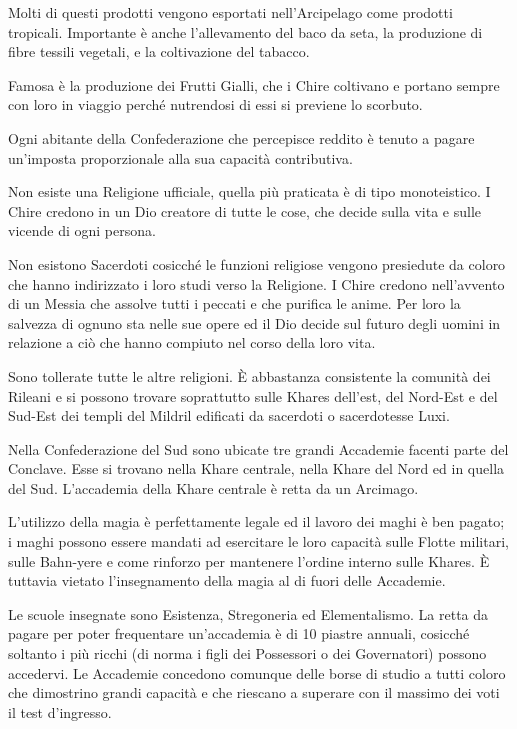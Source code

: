Molti di questi prodotti vengono esportati nell'Arcipelago come
prodotti tropicali.  Importante \`e anche l'allevamento del baco da
seta, la produzione di fibre tessili vegetali, e la coltivazione del
tabacco.

Famosa \`e la produzione dei Frutti Gialli, che i Chire coltivano e
portano sempre con loro in viaggio perch\'e nutrendosi di essi si
previene lo scorbuto.  

Ogni abitante della Confederazione che percepisce reddito \`e tenuto a
pagare un'imposta proporzionale alla sua capacit\`a contributiva.

\Religione Non esiste una Religione ufficiale, quella pi\`u praticata
\`e di tipo monoteistico. I Chire credono in un Dio creatore di tutte le cose,
che decide sulla vita e sulle vicende di ogni persona.

Non esistono Sacerdoti cosicch\'e le funzioni religiose vengono
presiedute da coloro che hanno indirizzato i loro studi verso la
Religione.  I Chire credono nell'avvento di un Messia che assolve
tutti i peccati e che purifica le anime. Per loro la salvezza di
ognuno sta nelle sue opere ed il Dio decide sul futuro degli uomini in
relazione a ci\`o che hanno compiuto nel corso della loro vita.

Sono tollerate tutte le altre religioni. \`E abbastanza consistente la
comunit\`a dei Rileani e si possono trovare soprattutto sulle Khares
dell'est, del Nord-Est e del Sud-Est dei templi del Mildril edificati
da sacerdoti o sacerdotesse Luxi.

\Magia Nella Confederazione del Sud sono ubicate tre grandi Accademie
facenti parte del Conclave. Esse si trovano nella Khare centrale,
nella Khare del Nord ed in quella del Sud. L'accademia della Khare
centrale \`e retta da un Arcimago.

L'utilizzo della magia \`e perfettamente legale ed il lavoro dei maghi
\`e ben pagato; i maghi possono essere mandati ad esercitare le loro
capacit\`a sulle Flotte militari, sulle Bahn-yere e come rinforzo per
mantenere l'ordine interno sulle Khares. \`E tuttavia vietato
l'insegnamento della magia al di fuori delle Accademie.

Le scuole insegnate sono Esistenza, Stregoneria ed Elementalismo. La
retta da pagare per poter frequentare un'accademia \`e di 10 piastre
annuali, cosicch\'e soltanto i pi\`u ricchi (di norma i figli dei
Possessori o dei Governatori) possono accedervi. Le Accademie
concedono comunque delle borse di studio a tutti coloro che dimostrino
grandi capacit\`a e che riescano a superare con il massimo dei voti il
test d'ingresso.

